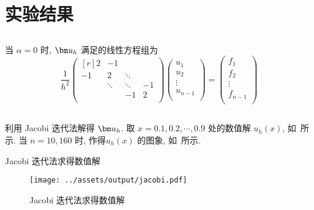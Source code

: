 \documentclass{nedsart}
\begin{document}
\clearpage

\section{实验结果}

\subsection[第1题]{}
当 $\alpha = 0$ 时, $\uh$ 满足的线性方程组为
\begin{equation}\label{eq:ans1}
    \frac{1}{h^2}
    \begin{pmatrix*}[r]
        2   & -1     &        &     \\
        -1  & 2      & \ddots &     \\
            & \ddots & \ddots & -1  \\
            &        & -1     & 2   \\
    \end{pmatrix*}
    \begin{pmatrix}
        u_1     \\
        u_2     \\
        \vdots  \\
        u_{n-1} \\
    \end{pmatrix}
    =
    \begin{pmatrix}
        f_1     \\
        f_2     \\
        \vdots  \\
        f_{n-1} \\
    \end{pmatrix}
\end{equation}

\subsection[第2题]{}
利用 Jacobi 迭代法解得 $\uh$. 取 $ x = 0.1, 0.2, \cdots, 0.9$ 处的数值解 $u_h(x)$, 如~所示. 当 $n = 10, 160$ 时, 作得$u_h(x)$ 的图象, 如~所示.
\begin{table}[H]
    \small\centering
    \caption{Jacobi 迭代法求得数值解}\label{tab:jacobi}
\end{table}
\begin{figure}[H]
    \centering
    \texttt{[image: ../assets/output/jacobi.pdf]}
    \caption{Jacobi 迭代法求得数值解}\label{fig:jacobi}
\end{figure}\noindent
\end{document}

